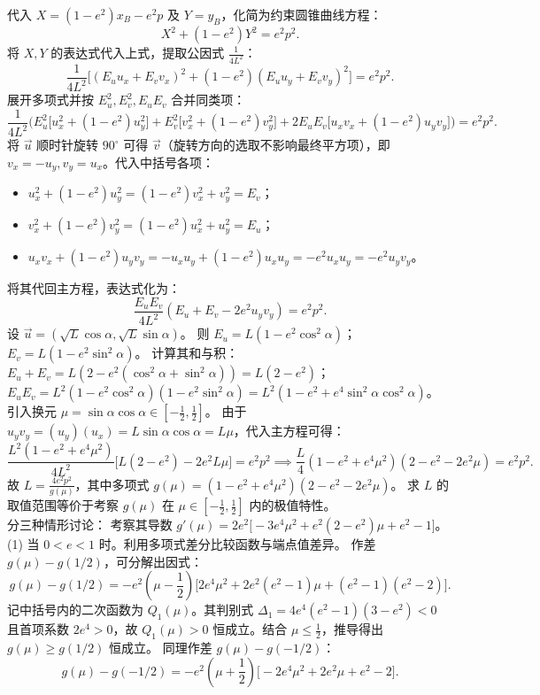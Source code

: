 \begin{solution}
代入 $X = (1-e^2)x_B - e^2p$ 及 $Y = y_B$，化简为约束圆锥曲线方程：
\[ X^2 + (1-e^2)Y^2 = e^2p^2. \]
将 $X, Y$ 的表达式代入上式，提取公因式 $\frac{1}{4L^2}$：
\[ \frac{1}{4L^2} \Big[ (E_u u_x + E_v v_x)^2 + (1-e^2)(E_u u_y + E_v v_y)^2 \Big] = e^2p^2. \]
展开多项式并按 $E_u^2, E_v^2, E_u E_v$ 合并同类项：
\[ \frac{1}{4L^2} \Big( E_u^2 \big[ u_x^2 + (1-e^2)u_y^2 \big] + E_v^2 \big[ v_x^2 + (1-e^2)v_y^2 \big] + 2E_u E_v \big[ u_x v_x + (1-e^2)u_y v_y \big] \Big) = e^2p^2. \]
将 $\vec{u}$ 顺时针旋转 $90^\circ$ 可得 $\vec{v}$（旋转方向的选取不影响最终平方项），即 $v_x = -u_y, v_y = u_x$。代入中括号各项：
\begin{itemize}
\item  $u_x^2 + (1-e^2)u_y^2 = (1-e^2)v_x^2 + v_y^2 = E_v$；
\item $v_x^2 + (1-e^2)v_y^2 = (1-e^2)u_x^2 + u_y^2 = E_u$；
\item $u_x v_x + (1-e^2)u_y v_y = -u_x u_y + (1-e^2)u_x u_y = -e^2 u_x u_y = -e^2 u_y v_y$。
\end{itemize}
将其代回主方程，表达式化为：
\[ \frac{E_u E_v}{4L^2} (E_u + E_v - 2e^2 u_y v_y) = e^2p^2. \]
设 $\vec{u} = (\sqrt{L}\cos\alpha, \sqrt{L}\sin\alpha)$。
则
$E_u = L(1-e^2\cos^2\alpha)$；$E_v = L(1-e^2\sin^2\alpha)$。
计算其和与积：
$E_u + E_v = L(2 - e^2(\cos^2\alpha+\sin^2\alpha)) = L(2-e^2)$；
$E_u E_v = L^2(1-e^2\cos^2\alpha)(1-e^2\sin^2\alpha) = L^2(1 - e^2 + e^4\sin^2\alpha\cos^2\alpha)$。
引入换元 $\mu = \sin\alpha\cos\alpha \in \left[-\frac{1}{2}, \frac{1}{2}\right]$。
由于 $u_y v_y = (u_y)(u_x) = L\sin\alpha\cos\alpha = L\mu$，代入主方程可得：
\[ \frac{L^2(1-e^2+e^4\mu^2)}{4L^2} \big[ L(2-e^2) - 2e^2 L \mu \big] = e^2p^2 \implies \frac{L}{4}(1-e^2+e^4\mu^2)(2-e^2-2e^2\mu) = e^2p^2. \]
故 $L = \frac{4e^2p^2}{g(\mu)}$，其中多项式 $g(\mu) = (1-e^2+e^4\mu^2)(2-e^2-2e^2\mu)$。
求 $L$ 的取值范围等价于考察 $g(\mu)$ 在 $\mu \in \left[-\frac{1}{2}, \frac{1}{2}\right]$ 内的极值特性。\\
分三种情形讨论：
考察其导数 $g'(\mu) = 2e^2 \big[ -3e^4\mu^2 + e^2(2-e^2)\mu + e^2-1 \big]$。\\
(1) 当 $0 < e < 1$ 时。利用多项式差分比较函数与端点值差异。
作差 $g(\mu) - g(1/2)$，可分解出因式：
\[ g(\mu) - g(1/2) = -e^2 \left(\mu - \frac{1}{2}\right) \big[ 2e^4\mu^2 + 2e^2(e^2-1)\mu + (e^2-1)(e^2-2) \big]. \]
记中括号内的二次函数为 $Q_1(\mu)$。其判别式 $\Delta_1 = 4e^4(e^2-1)(3-e^2) < 0$ 且首项系数 $2e^4>0$，故 $Q_1(\mu) > 0$ 恒成立。结合 $\mu \le \frac{1}{2}$，推导得出 $g(\mu) \ge g(1/2)$ 恒成立。
同理作差 $g(\mu) - g(-1/2)$：
\[ g(\mu) - g(-1/2) = -e^2 \left(\mu + \frac{1}{2}\right) \big[ -2e^4\mu^2 + 2e^2\mu + e^2-2 \big]. \]

\end{solution}
